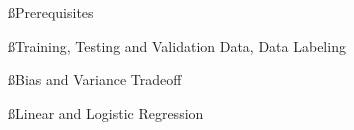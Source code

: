 %
%


\ss{Prerequisites}

\ss{Training, Testing and Validation Data, Data Labeling}

\ss{Bias and Variance Tradeoff}

\ss{Linear and Logistic Regression}
